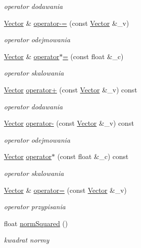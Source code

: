 \begin{DoxyCompactItemize}
\begin{DoxyCompactList}\small\item\em operator dodawania \end{DoxyCompactList}\item 
\hyperlink{class_vector}{Vector} \& \hyperlink{class_vector_aaaf87dbf15cd9492aa0c11874ae5afef}{operator-\/=} (const \hyperlink{class_vector}{Vector} \&\-\_\-v)
\begin{DoxyCompactList}\small\item\em operator odejmowania \end{DoxyCompactList}\item 
\hyperlink{class_vector}{Vector} \& \hyperlink{class_vector_a91ebac6d502ca1d54645e7c711549867}{operator$\ast$=} (const float \&\-\_\-c)
\begin{DoxyCompactList}\small\item\em operator skalowania \end{DoxyCompactList}\item 
\hyperlink{class_vector}{Vector} \hyperlink{class_vector_aa78eb4c9e5ac236c89f0853eefa347ac}{operator+} (const \hyperlink{class_vector}{Vector} \&\-\_\-v) const 
\begin{DoxyCompactList}\small\item\em operator dodawania \end{DoxyCompactList}\item 
\hyperlink{class_vector}{Vector} \hyperlink{class_vector_a94b6fde82bef6532c00358a0af448fc1}{operator-\/} (const \hyperlink{class_vector}{Vector} \&\-\_\-v) const 
\begin{DoxyCompactList}\small\item\em operator odejmowania \end{DoxyCompactList}\item 
\hyperlink{class_vector}{Vector} \hyperlink{class_vector_a8f0e64ee9a688803b1efce30fb0b2869}{operator$\ast$} (const float \&\-\_\-c) const 
\begin{DoxyCompactList}\small\item\em operator skalowania \end{DoxyCompactList}\item 
\hyperlink{class_vector}{Vector} \& \hyperlink{class_vector_ad44f6d9721d9584e7f847e449df73e11}{operator=} (const \hyperlink{class_vector}{Vector} \&\-\_\-v)
\begin{DoxyCompactList}\small\item\em operator przypisania \end{DoxyCompactList}\item 
float \hyperlink{class_vector_a18d3f2110be751ac3a658016bd3dca69}{norm\-Squared} ()
\begin{DoxyCompactList}\small\item\em kwadrat normy \end{DoxyCompactList}\end{DoxyCompactItemize}
